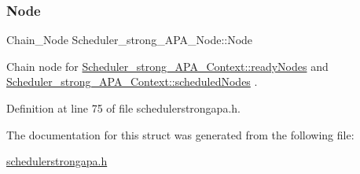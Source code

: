 \subsubsection{\texorpdfstring{Node}{Node}}
{\footnotesize\ttfamily Chain\+\_\+\+Node Scheduler\+\_\+strong\+\_\+\+A\+P\+A\+\_\+\+Node\+::\+Node}



Chain node for \hyperlink{structScheduler__strong__APA__Context_a5b31ff1b54bde351d53a41abee3e91ed}{Scheduler\+\_\+strong\+\_\+\+A\+P\+A\+\_\+\+Context\+::ready\+Nodes} and \hyperlink{structScheduler__strong__APA__Context_a144c4296c745b8d5bfa5e3a00fe14e81}{Scheduler\+\_\+strong\+\_\+\+A\+P\+A\+\_\+\+Context\+::scheduled\+Nodes} . 



Definition at line 75 of file schedulerstrongapa.\+h.



The documentation for this struct was generated from the following file\+:\begin{DoxyCompactItemize}
\item 
\hyperlink{schedulerstrongapa_8h}{schedulerstrongapa.\+h}\end{DoxyCompactItemize}
